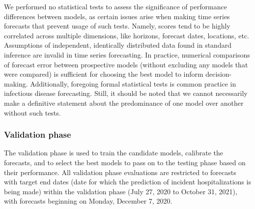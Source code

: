 \documentclass[12pt]{article}
\begin{document}
We performed no statistical tests to assess the significance of performance differences between models, as certain issues arise when making time series forecasts that prevent usage of such tests. Namely, scores tend to be highly correlated across multiple dimensions, like horizons, forecast dates, locations, etc. Assumptions of independent, identically distributed data found in standard inference are invalid in time series forecasting. In practice, numerical comparisons of forecast error between prospective models (without excluding any models that were compared) is sufficient for choosing the best model to inform decision-making. Additionally, foregoing formal statistical tests is common practice in infectious disease forecasting. Still, it should be noted that we cannot necessarily make a definitive statement about the predominance of one model over another without such tests\cite{lauer}.

\subsubsection{Validation phase} \label{validation_eval}
The validation phase is used to train the candidate models, calibrate the forecasts, and to select the best models to pass on to the testing phase based on their performance. All validation phase evaluations are restricted to forecasts with target end dates (date for which the prediction of incident hospitalizations is being made) within the validation phase (July 27, 2020 to October 31, 2021), with forecasts beginning on Monday, December 7, 2020.
\end{document}
